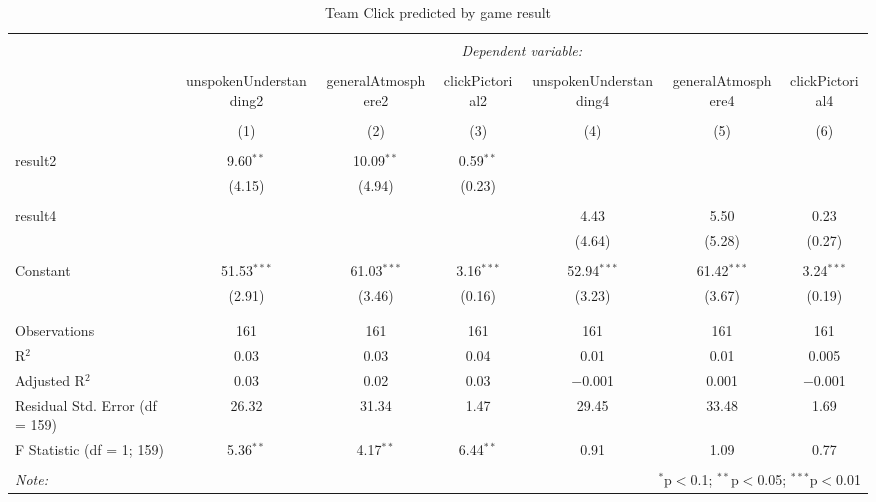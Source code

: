 
\begin{table}[!htbp] \centering 
  \caption{Team Click predicted by game result} 
  \label{} 
\begin{tabular}{@{\extracolsep{5pt}}lcccccc} 
\\[-1.8ex]\hline 
\hline \\[-1.8ex] 
 & \multicolumn{6}{c}{\textit{Dependent variable:}} \\ 
\cline{2-7} 
\\[-1.8ex] & unspokenUnderstanding2 & generalAtmosphere2 & clickPictorial2 & unspokenUnderstanding4 & generalAtmosphere4 & clickPictorial4 \\ 
\\[-1.8ex] & (1) & (2) & (3) & (4) & (5) & (6)\\ 
\hline \\[-1.8ex] 
 result2 & 9.60$^{**}$ & 10.09$^{**}$ & 0.59$^{**}$ &  &  &  \\ 
  & (4.15) & (4.94) & (0.23) &  &  &  \\ 
  & & & & & & \\ 
 result4 &  &  &  & 4.43 & 5.50 & 0.23 \\ 
  &  &  &  & (4.64) & (5.28) & (0.27) \\ 
  & & & & & & \\ 
 Constant & 51.53$^{***}$ & 61.03$^{***}$ & 3.16$^{***}$ & 52.94$^{***}$ & 61.42$^{***}$ & 3.24$^{***}$ \\ 
  & (2.91) & (3.46) & (0.16) & (3.23) & (3.67) & (0.19) \\ 
  & & & & & & \\ 
\hline \\[-1.8ex] 
Observations & 161 & 161 & 161 & 161 & 161 & 161 \\ 
R$^{2}$ & 0.03 & 0.03 & 0.04 & 0.01 & 0.01 & 0.005 \\ 
Adjusted R$^{2}$ & 0.03 & 0.02 & 0.03 & $-$0.001 & 0.001 & $-$0.001 \\ 
Residual Std. Error (df = 159) & 26.32 & 31.34 & 1.47 & 29.45 & 33.48 & 1.69 \\ 
F Statistic (df = 1; 159) & 5.36$^{**}$ & 4.17$^{**}$ & 6.44$^{**}$ & 0.91 & 1.09 & 0.77 \\ 
\hline 
\hline \\[-1.8ex] 
\textit{Note:}  & \multicolumn{6}{r}{$^{*}$p$<$0.1; $^{**}$p$<$0.05; $^{***}$p$<$0.01} \\ 
\end{tabular} 
\end{table} 

